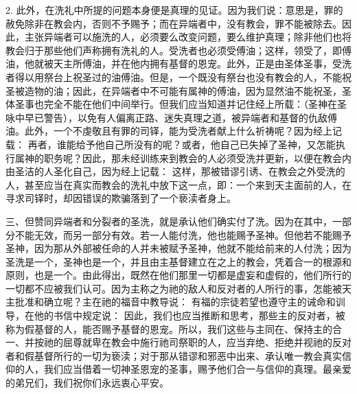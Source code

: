2. 此外，在洗礼中所提的问题本身便是真理的见证。因为我们说：意思是，罪的赦免除非在教会内，否则不予赐予；而在异端者中，没有教会，罪不能被除去。因此，主张异端者可以施洗的人，必须要么改变问题，要么维护真理；除非他们也将教会归于那些他们声称拥有洗礼的人。受洗者也必须受傅油；这样，领受了，即傅油，他就被天主所傅油，并在他内拥有基督的恩宠。此外，正是由圣体圣事，受洗者得以用祭台上祝圣过的油傅油。但是，一个既没有祭台也没有教会的人，不能祝圣被造物的油；因此，在异端者中不可能有属神的傅油，因为显然油不能祝圣，圣体圣事也完全不能在他们中间举行。但我们应当知道并记住经上所载：（圣神在圣咏中早已警告），以免有人偏离正路、迷失真理之道，被异端者和基督的仇敌傅油。此外，一个不虔敬且有罪的司铎，能为受洗者献上什么祈祷呢？因为经上记载： 再者，谁能给予他自己所没有的呢？或者，他自己已失掉了圣神，又怎能执行属神的职务呢？因此，那未经训练来到教会的人必须受洗并更新，以便在教会内由圣洁的人圣化自己，因为经上记载： 这样，那被错谬引诱、在教会之外受洗的人，甚至应当在真实而教会的洗礼中放下这一点，即：一个来到天主面前的人，在寻求司铎时，却因错误的欺骗落到了一个亵渎者身上。\par

三、但赞同异端者和分裂者的圣洗，就是承认他们确实付了洗。因为在其中，一部分不能无效，而另一部分有效。若一人能付洗，他也能赐予圣神。但他若不能赐予圣神，因为那从外部被任命的人并未被赋予圣神，他就不能给前来的人付洗；因为圣洗是一个，圣神也是一个，并且由主基督建立在之上的教会，凭着合一的根源和原则，也是一个。由此得出，既然在他们那里一切都是虚妄和虚假的，他们所行的一切都不应被我们认可。因为主称之为祂的敌人和反对者的人所行的事，怎能被天主批准和确立呢？主在祂的福音中教导说： 有福的宗徒若望也遵守主的诫命和训导，在他的书信中规定说： 因此，我们也应当推断和思考，那些主的反对者，被称为假基督的人，能否赐予基督的恩宠。所以，我们这些与主同在、保持主的合一、并按祂的屈尊就卑在教会中施行祂司祭职的人，应当弃绝、拒绝并视祂的反对者和假基督所行的一切为亵渎；对于那从错谬和邪恶中出来、承认唯一教会真实信仰的人，我们应当借着一切神圣恩宠的圣事，赐予他们合一与信仰的真理。最亲爱的弟兄们，我们祝你们永远衷心平安。\par


